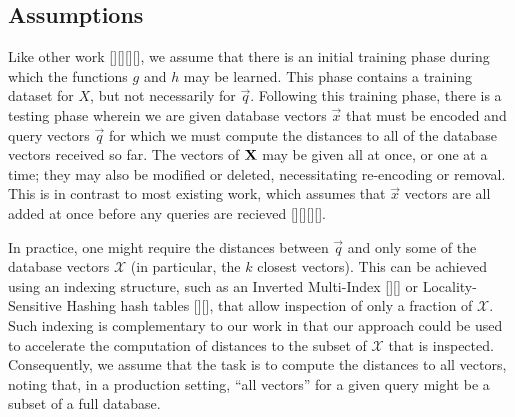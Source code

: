 \subsection{Assumptions}

Like other work [][][][], we assume that there is an initial training phase during which the functions $g$ and $h$ may be learned. This phase contains a training dataset for $X$, but not necessarily for $\vec{q}$. Following this training phase, there is a testing phase wherein we are given database vectors $\vec{x}$ that must be encoded and query vectors $\vec{q}$ for which we must compute the distances to all of the database vectors received so far. The vectors of $\mathbf{X}$ may be given all at once, or one at a time; they may also be modified or deleted, necessitating re-encoding or removal. This is in contrast to most existing work, which assumes that $\vec{x}$ vectors are all added at once before any queries are recieved [][][][].

In practice, one might require the distances between $\vec{q}$ and only some of the database vectors $\mathcal{X}$ (in particular, the $k$ closest vectors). This can be achieved using an indexing structure, such as an Inverted Multi-Index [][] or Locality-Sensitive Hashing hash tables [][], that allow inspection of only a fraction of $\mathcal{X}$. Such indexing is complementary to our work in that our approach could be used to accelerate the computation of distances to the subset of $\mathcal{X}$ that is inspected. Consequently, we assume that the task is to compute the distances to all vectors, noting that, in a production setting, ``all vectors'' for a given query might be a subset of a full database.








